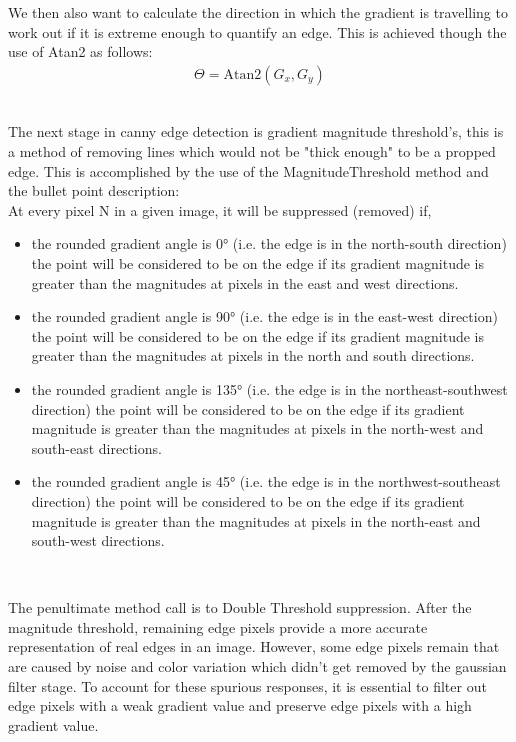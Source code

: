\begin{FlushLeft}
\begin{enumerate}
    We then also want to calculate the direction in which the gradient is travelling to work out if it is extreme enough to quantify an edge. This is achieved though the use of Atan2 as follows:\\
    
    \begin{gather*}
        \Theta = \text{Atan2}(G_x, G_y)
    \end{gather*} \\ 

    \bk

    The next stage in canny edge detection is gradient magnitude threshold's, this is a method of removing lines which would not be "thick enough" to be a propped edge. This is accomplished by the use of the MagnitudeThreshold method and the bullet point description: \\ 
    
    At every pixel N in a given image, it will be suppressed (removed) if,
    \begin{itemize}
        \item the rounded gradient angle is 0° (i.e. the edge is in the north-south direction) the point will be considered to be on the edge if its gradient magnitude is greater than the magnitudes at pixels in the east and west directions.
        \item the rounded gradient angle is 90° (i.e. the edge is in the east-west direction) the point will be considered to be on the edge if its gradient magnitude is greater than the magnitudes at pixels in the north and south directions.
        \item the rounded gradient angle is 135° (i.e. the edge is in the northeast-southwest direction) the point will be considered to be on the edge if its gradient magnitude is greater than the magnitudes at pixels in the north-west and south-east directions.
        \item the rounded gradient angle is 45° (i.e. the edge is in the northwest-southeast direction) the point will be considered to be on the edge if its gradient magnitude is greater than the magnitudes at pixels in the north-east and south-west directions.

    \end{itemize}
    
    \\ \bk

    The penultimate method call is to Double Threshold suppression. After the magnitude threshold, remaining edge pixels provide a more accurate representation of real edges in an image. However, some edge pixels remain that are caused by noise and color variation which didn't get removed by the gaussian filter stage. To account for these spurious responses, it is essential to filter out edge pixels with a weak gradient value and preserve edge pixels with a high gradient value. \\


\end{enumerate}
\end{FlushLeft}
